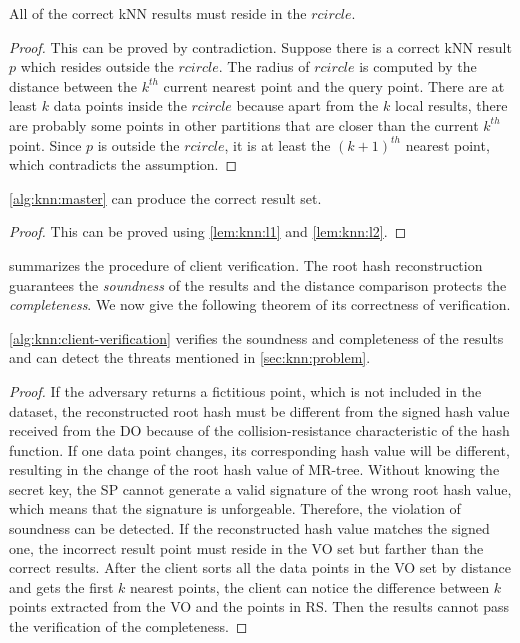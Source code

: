 \begin{lemma}\label{lem:knn:l2}
  All of the correct kNN results must reside in the $rcircle$.
\end{lemma}

\begin{proof}
  This can be proved by contradiction. Suppose there is a correct kNN result $p$ which resides outside the $rcircle$. The radius of $rcircle$ is computed by the distance between the $k^{th}$ current nearest point and the query point. There are at least $k$ data points inside the $rcircle$ because apart from the $k$ local results, there are probably some points in other partitions that are closer than the current $k^{th}$ point. Since $p$ is outside the $rcircle$, it is at least the ${(k+1)}^{th}$ nearest point, which contradicts the assumption.
\end{proof}

\begin{theorem}
  \cref{alg:knn:master} can produce the correct result set.
\end{theorem}

\begin{proof}
  This can be proved using \cref{lem:knn:l1} and \cref{lem:knn:l2}.
\end{proof}

 summarizes the procedure of client verification. The root hash reconstruction guarantees the \emph{soundness} of the results and the distance comparison protects the \emph{completeness}. We now give the following theorem of its correctness of verification.

\begin{theorem}\label{thm:knn:verify}
  \cref{alg:knn:client-verification} verifies the soundness and completeness of the results and can detect the threats mentioned in \cref{sec:knn:problem}.
\end{theorem}

\begin{proof}
  If the adversary returns a fictitious point, which is not included in the dataset, the reconstructed root hash must be different from the signed hash value received from the DO because of the collision-resistance characteristic of the hash function. If one data point changes, its corresponding hash value will be different, resulting in the change of the root hash value of MR-tree. Without knowing the secret key, the SP cannot generate a valid signature of the wrong root hash value, which means that the signature is unforgeable. Therefore, the violation of soundness can be detected. If the reconstructed hash value matches the signed one, the incorrect result point must reside in the VO set but farther than the correct results. After the client sorts all the data points in the VO set by distance and gets the first $k$ nearest points, the client can notice the difference between $k$ points extracted from the VO and the points in RS\@. Then the results cannot pass the verification of the completeness.
\end{proof}

